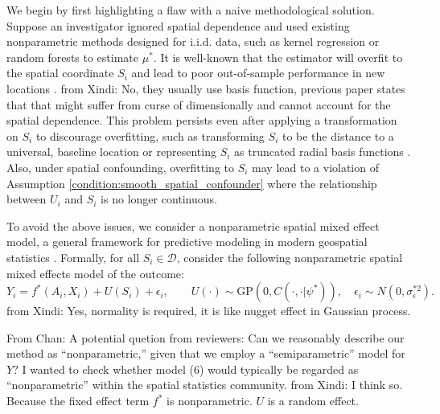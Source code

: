 \documentclass[12pt]{article}
\newcommand{\CP}[1]{{\color{purple}From Chan: #1}}
\newcommand{\XL}[1]{{\color{blue}from Xindi: #1}}
\begin{document}
We begin by first highlighting a flaw with a naive methodological solution. Suppose an investigator ignored spatial dependence and  used existing nonparametric methods designed for i.i.d. data, such as kernel regression or random forests \citep{breiman2001random} to estimate $\mu^*$. It is well-known that the estimator will overfit to the spatial coordinate $S_i$ and lead to poor out-of-sample performance in new locations \citep{saha2023random,zhan2024neural}. \XL{No, they usually use basis function, previous paper states that that might suffer from curse of dimensionally and cannot account for the spatial dependence.} %
This problem persists even after applying a transformation on $S_i$ to discourage overfitting, such as transforming $S_i$ to be the distance to a universal, baseline location or representing $S_i$ as truncated radial basis functions \citep{hengl2018random,chen2020deepkriging,gray2022use}. Also, under spatial confounding, overfitting to $S_i$ may lead to a violation of Assumption \ref{condition:smooth_spatial_confounder} where the relationship between $U_i$ and $S_i$ is no longer continuous.



To avoid the above issues, we consider a nonparametric spatial mixed effect model, a general framework for predictive modeling in modern geospatial 
statistics \citep{sigrist2022gaussian,saha2023random, zhan2024neural}. Formally, for all $S_i \in \mathcal{D}$, consider the following nonparametric spatial mixed effects model of the outcome:
\begin{equation}\label{eq:spatial_mixed_effect_model}
    Y_i = f^*(A_i,X_i) + U(S_i)+\epsilon_i, \qquad U(\cdot)\sim \mathrm{GP}(0,C(\cdot,\cdot|\psi^*)),\quad \epsilon_i\sim N(0,\sigma_\epsilon^{*2}).
\end{equation}
\XL{Yes, normality is required, it is like nugget effect in Gaussian process.}

\CP{A potential quetion from reviewers: Can we reasonably describe our method as ``nonparametric,'' given that we employ a ``semiparametric'' model for $Y$? I wanted to check whether model (6) would typically be regarded as ``nonparametric'' within the spatial statistics community.} \XL{I think so. Because the fixed effect term $f^*$ is nonparametric. $U$ is a random effect. }
\end{document}

